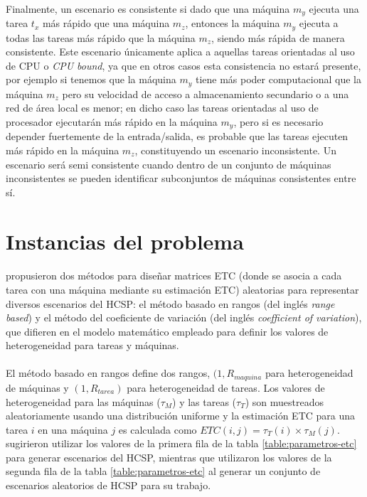 \paragraph{}Finalmente, un escenario es consistente si dado que una máquina $m_y$ ejecuta una tarea $t_x$ más rápido que una máquina $m_z$, entonces la máquina $m_y$ ejecuta a todas las tareas más rápido que la máquina $m_z$, siendo más rápida de manera consistente.
Este escenario únicamente aplica a aquellas tareas orientadas al uso de CPU o \textit{CPU bound}, ya que en otros casos esta consistencia no estará presente, por ejemplo si tenemos que la máquina $m_y$ tiene más poder computacional que la máquina $m_z$ pero su velocidad de acceso a almacenamiento secundario o a una red de área local es menor; en dicho caso las tareas orientadas al uso de procesador ejecutarán más rápido en la máquina $m_y$, pero si es necesario depender fuertemente de la entrada/salida, es probable que las tareas ejecuten más rápido en la máquina $m_z$, constituyendo un escenario inconsistente.
Un escenario será semi consistente cuando dentro de un conjunto de máquinas inconsistentes se pueden identificar subconjuntos de máquinas consistentes entre sí.

\section{Instancias del problema} \label{section:descripcion-problema,subsection:instancias-del-problema}

\paragraph{}\citet{bib-ali-hc-etc} propusieron dos métodos para diseñar matrices ETC (donde se asocia a cada tarea con una máquina mediante su estimación ETC) aleatorias para representar diversos escenarios del HCSP: el método basado en rangos (del inglés \textit{range based}) y el método del coeficiente de variación (del inglés \textit{coefficient of variation}), que difieren en el modelo matemático empleado para definir los valores de heterogeneidad para tareas y máquinas.

\paragraph{}El método basado en rangos define dos rangos, $(1, R_{maquina}$ para heterogeneidad de máquinas y $(1, R_{tarea})$ para heterogeneidad de tareas.
Los valores de heterogeneidad para las máquinas ($\tau_{M}$) y las tareas ($\tau_{T}$) son muestreados aleatoriamente usando una distribución uniforme y la estimación ETC para una tarea $i$ en una máquina $j$ es calculada como $ETC(i,j) = \tau_{T}(i) \times \tau_{M}(j)$.
\citet{bib-ali-hc-etc} sugirieron utilizar los valores de la primera fila de la tabla \ref{table:parametros-etc} para generar escenarios del HCSP, mientras que \citet{bib-braun} utilizaron los valores de la segunda fila de la tabla \ref{table:parametros-etc} al generar un conjunto de escenarios aleatorios de HCSP para su trabajo.

